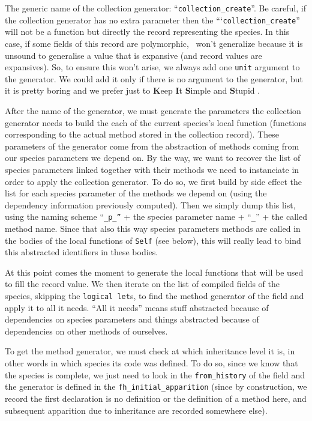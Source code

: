 \medskip
The generic name of the collection generator:
``{\tt collection\_create}''. Be careful, if the collection generator
has no extra parameter then the ``{`\tt collection\_create}'' will not
be a function but directly the record representing the species. In
this case, if some fields of this record are polymorphic, \ocaml\
won't generalize because it is unsound to generalise a value that is
expansive (and record values are expansives). So, to ensure this won't
arise, we always add one {\tt unit} argument to the generator. We
could add it only if there is no argument to the generator, but it is
pretty boring and we prefer just to {\bf K}eep {\bf I}t {\bf S}imple
and {\bf S}tupid \smiley.

\medskip
After the name of the generator, we must generate the parameters the
collection generator needs to build the each of the current species's
local function (functions corresponding to the actual method stored in
the collection record). These parameters of the generator come from
the abstraction of methods coming from our species parameters we
depend on. By the way, we want to recover the list of species
parameters linked together with their methods we need to instanciate
in order to apply the collection generator. To do so, we first build
by side effect the list for each species parameter of the methods we
depend on (using the dependency information previously computed). Then
we simply dump this list, using the naming scheme ``{\tt \_p\_''} +
the species parameter name + ``{\tt \_}'' + the called method
name. Since that also this way species parameters methods are called
in the bodies of the local functions of {\tt Self} (see below), this
will really lead to bind this abstracted identifiers in these bodies.

\medskip
At this point comes the moment to generate the local functions that
will be used to fill the record value. We then iterate on the list of
compiled fields of the species, skipping the {\tt logical let}s, to
find the method generator of the field and apply it to all it
needs. ``All it needs'' means stuff abstracted because of dependencies
on species parameters and things abstracted because of dependencies on
other methods of ourselves.

To get the method generator, we must check at which inheritance level
it is, in other words in which species its code was defined. To do so,
since we know that the species is complete, we just need to look in
the {\tt from\_history} of the field and the generator is defined in
the {\tt fh\_initial\_apparition} (since by construction, we record
the first declaration is no definition or the definition of a method
here, and subsequent apparition due to inheritance are recorded
somewhere else).

